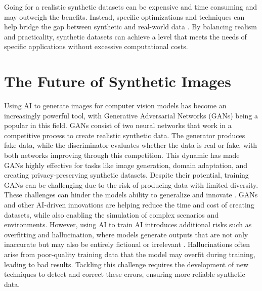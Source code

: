 \noindent Going for a realistic synthetic datasets can be expensive and time consuming and may outweigh the benefits. Instead, specific optimizations and techniques can help bridge the gap between synthetic and real-world data \cite{nikolenko2021synthetic, jimaging8110310}. By balancing realism and practicality, synthetic datasets can achieve a level that meets the needs of specific applications without excessive computational costs.


\section{The Future of Synthetic Images}

Using AI to generate images for computer vision models has become an increasingly powerful tool, with Generative Adversarial Networks (GANs) being a popular in this field. GANs consist of two neural networks that work in a competitive process to create realistic synthetic data. The generator produces fake data, while the discriminator evaluates whether the data is real or fake, with both networks improving through this competition. This dynamic has made GANs highly effective for tasks like image generation, domain adaptation, and creating privacy-preserving synthetic datasets. Despite their potential, training GANs can be challenging due to the risk of producing data with limited diversity. These challenges can hinder the models ability to generalize and innovate \cite{gan}. GANs and other AI-driven innovations are helping reduce the time and cost of creating datasets, while also enabling the simulation of complex scenarios and environments. However, using AI to train AI introduces additional risks such as overfitting and hallucination, where models generate outputs that are not only inaccurate but may also be entirely fictional or irrelevant \cite{hallucination}. Hallucinations often arise from poor-quality training data that the model may overfit during training, leading to bad results. Tackling this challenge requires the development of new techniques to detect and correct these errors, ensuring more reliable synthetic data.
